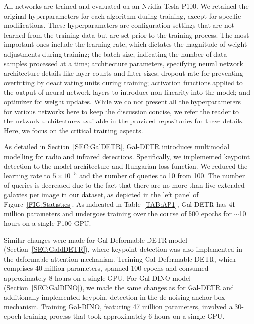 \documentclass[
  journal=pasa,
  manuscript=research-paper, %
  year=2020,
  volume=37,
]{cup-journal}
\begin{document}
All networks are trained and evaluated on an Nvidia Tesla P100.
We retained the original hyperparameters for each algorithm during training, except for specific modifications.
These hyperparameters are configuration settings that are not learned from the training data but are set prior to the training process.
The most important ones include the learning rate, which dictates the magnitude of weight adjustments during training; the batch size, indicating the number of data samples processed at a time; architecture parameters, specifying neural network architecture details like layer counts and filter sizes;  dropout rate for preventing overfitting by deactivating units during training; activation functions applied to the output of neural network layers to introduce non-linearity into the model; and optimizer for weight updates.
While we do not present all the hyperparameters for various networks here to keep the discussion concise, we refer the reader to the network architectures available in the provided repositories for these details.  
Here, we focus on the critical training aspects.

As detailed in Section~\ref{SEC:GalDETR}, Gal-DETR introduces multimodal modelling for radio and infrared detections.
Specifically, we implemented keypoint detection to the model architecture and Hungarian loss function. 
We reduced the learning rate to $5\times 10^{-5}$ and the number of queries to 10 from 100. 
The number of queries is decreased due to the fact that there are no more than five extended galaxies per image in our dataset, as depicted in the left panel of Figure~\ref{FIG:Statistics}.
As indicated in Table~\ref{TAB:AP1}, Gal-DETR has 41 million parameters and undergoes training over the course of 500 epochs for $\sim$10 hours on a single P100 GPU.

Similar changes were made for Gal-Deformable DETR model (Section~\ref{SEC:GaldDETR}), where keypoint detection was also implemented in the deformable attention mechanism. 
Training Gal-Deformable DETR, which comprises 40 million parameters, spanned 100 epochs and consumed approximately 8 hours on a single GPU.
For Gal-DINO model (Section~\ref{SEC:GalDINO}), we made the same changes as for Gal-DETR and additionally implemented keypoint detection in the de-noising anchor box mechanism.
Training Gal-DINO, featuring 47 million parameters, involved a 30-epoch training process that took approximately 6 hours on a single GPU.
\end{document}
